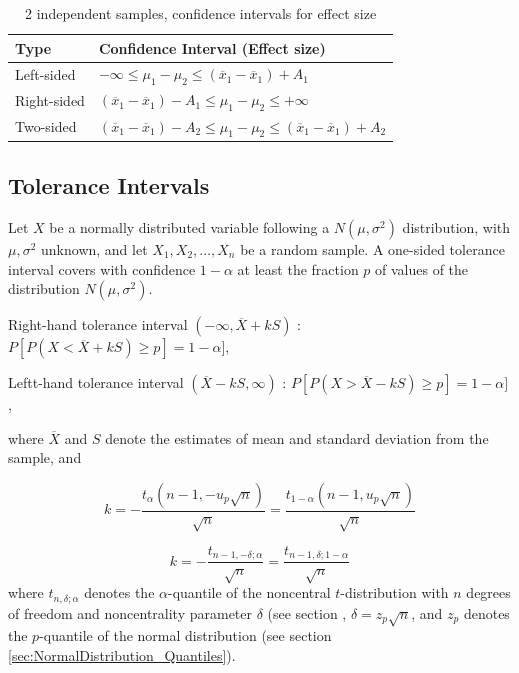 \begin{table}[ht]
	\centering
	\begin{tabular}{|l|l|}
		\hline
		Type & Confidence Interval (Effect size)\\
		\hline
		Left-sided &  $-\infty \leq \mu_1 - \mu_2 \leq (\overline{x}_1-\overline{x}_1) + A_1$ \\
		Right-sided &  $(\overline{x}_1-\overline{x}_1) - A_1 \leq \mu_1 - \mu_2 \leq +\infty$\\
		Two-sided & $(\overline{x}_1-\overline{x}_1) - A_2 \leq \mu_1 - \mu_2 \leq (\overline{x}_1-\overline{x}_1) + A_2$ \\
		\hline
	\end{tabular}
	\caption{2 independent samples, confidence intervals for effect size}
	\label{TableStudentsttest,2i samples, EffectSize}
\end{table}





\subsection{Tolerance Intervals}
Let $X$ be a normally distributed variable following a $N(\mu,\sigma^2)$ distribution, with $\mu, \sigma^2$ unknown, and let $X_1,X_2,\ldots,X_n$ be a random sample.
A one-sided tolerance interval covers with confidence $1-\alpha$ at least the fraction $p$ of values of the distribution $N(\mu,\sigma^2)$.

Right-hand tolerance interval $(-\infty, \overline{X} + kS)$ : $P[P(X<\overline{X} + kS) \geq p] =1-\alpha]$,

Leftt-hand tolerance interval $(\overline{X} - kS, \infty)$ : $P[P(X>\overline{X} - kS) \geq p] =1-\alpha]$,

where $\overline{X}$ and $S$ denote the estimates of mean and standard deviation from the sample, and 

\begin{equation}
	k=-\frac{t_\alpha(n-1,-u_p \sqrt{n})}{\sqrt{n}} =\frac{t_{1-\alpha}(n-1,u_p \sqrt{n})}{\sqrt{n}}
\end{equation}

\begin{equation}
	k=-\frac{t_{n-1,-\delta;\alpha}}{\sqrt{n}} =\frac{t_{n-1,\delta;1-\alpha}}{\sqrt{n}}
\end{equation}
where $t_{n,\delta;\alpha}$ denotes the $\alpha$-quantile of the noncentral $t$-distribution with $n$ degrees of freedom and noncentrality parameter $\delta$ (see section 
, $\delta=z_p \sqrt{n}$, and $z_p$ denotes the $p$-quantile of the normal distribution (see section \ref{sec:NormalDistribution_Quantiles}).

